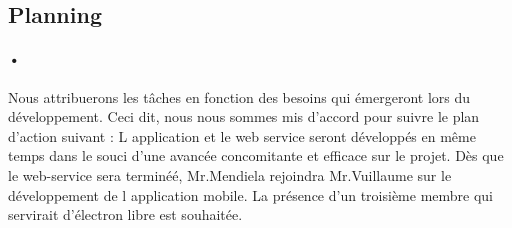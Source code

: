 \documentclass[pdftex,12pt,a4paper]{article}
\begin{document}
\subsection{Planning}
\paragraph{•}
Nous attribuerons les t\^aches en fonction des besoins qui \'emergeront lors du d\'eveloppement. Ceci dit, nous nous sommes mis d’accord pour suivre le plan d’action suivant : 
L application et le web service seront d\'evelopp\'es en m\^eme temps dans le souci d’une avanc\'ee concomitante et efficace sur le projet. D\`es que le web-service sera terminé\'e, Mr.Mendiela rejoindra Mr.Vuillaume sur le d\'eveloppement de l application mobile. La pr\'esence d’un troisi\`eme membre qui servirait d'\'electron libre est souhait\'ee.
\end{document}
